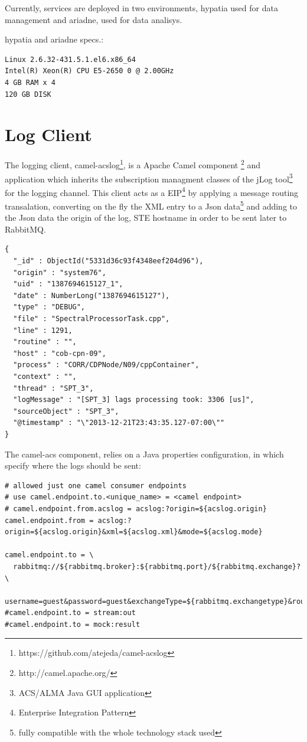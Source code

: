 \documentclass[]{spie}  %
\begin{document}
Currently, services are deployed in two environments, hypatia used for data 
management and ariadne, used for data analisys.

hypatia and ariadne specs.:

{\small
\begin{verbatim}
Linux 2.6.32-431.5.1.el6.x86_64
Intel(R) Xeon(R) CPU E5-2650 0 @ 2.00GHz
4 GB RAM x 4
120 GB DISK
\end{verbatim}
}

\section{Log Client}

The logging client, camel-acslog\footnote{https://github.com/atejeda/camel-acslog}, 
is a Apache Camel component \footnote{http://camel.apache.org/} and application 
which inherits the subscription managment classes of the jLog 
tool\footnote{ACS/ALMA Java GUI application} for the logging 
channel\cite{mora2012alma}. This client acts as a 
EIP\footnote{Enterprise Integration Pattern} by applying a message routing 
transalation, converting on the fly the XML entry to a Json 
data\footnote{fully compatible with the whole technology stack used} and adding 
to the Json data the origin of the log, STE hostname in order to be sent later 
to RabbitMQ.

{\small
\begin{verbatim}
{
  "_id" : ObjectId("5331d36c93f4348eef204d96"),
  "origin" : "system76",
  "uid" : "1387694615127_1",
  "date" : NumberLong("1387694615127"),
  "type" : "DEBUG",
  "file" : "SpectralProcessorTask.cpp",
  "line" : 1291,
  "routine" : "",
  "host" : "cob-cpn-09",
  "process" : "CORR/CDPNode/N09/cppContainer",
  "context" : "",
  "thread" : "SPT_3",
  "logMessage" : "[SPT_3] lags processing took: 3306 [us]",
  "sourceObject" : "SPT_3",
  "@timestamp" : "\"2013-12-21T23:43:35.127-07:00\""
}
\end{verbatim}
}

The camel-acs component, relies on a Java properties configuration, in which 
specify where the logs should be sent:

{\small
\begin{verbatim}
# allowed just one camel consumer endpoints
# use camel.endpoint.to.<unique_name> = <camel endpoint>
# camel.endpoint.from.acslog = acslog:?origin=${acslog.origin}
camel.endpoint.from = acslog:?origin=${acslog.origin}&xml=${acslog.xml}&mode=${acslog.mode}

camel.endpoint.to = \
  rabbitmq://${rabbitmq.broker}:${rabbitmq.port}/${rabbitmq.exchange}? \
  username=guest&password=guest&exchangeType=${rabbitmq.exchangetype}&routingKey=${rabbitmq.routing_key}
#camel.endpoint.to = stream:out
#camel.endpoint.to = mock:result
\end{verbatim}
}
\end{document}

